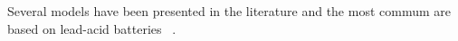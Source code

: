 \documentclass[journal]{IEEEtran}
\begin{document}
  
Several models have been presented in the literature and the most commum are based on lead-acid batteries ~\cite{Copetti,Manwell93,Pinho}. 
%
%
%
\end{document}
